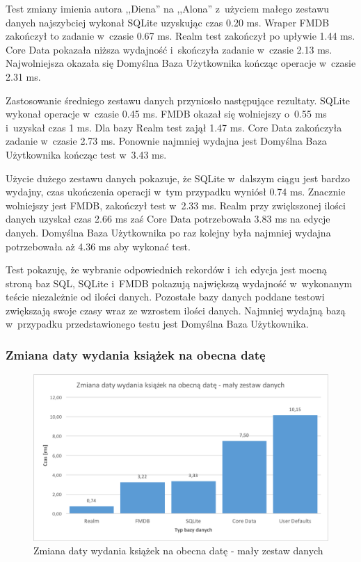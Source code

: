Test zmiany imienia autora ,,Diena'' na ,,Alona'' z~użyciem małego zestawu danych najszybciej wykonał SQLite uzyskując czas 0.20 ms. Wraper FMDB zakończył to zadanie w~czasie 0.67 ms. Realm test zakończył po upływie 1.44 ms. Core Data pokazała niższa wydajność i~skończyła zadanie w~czasie 2.13 ms. Najwolniejsza okazała się Domyślna Baza Użytkownika kończąc operacje w~czasie 2.31 ms. 

Zastosowanie średniego zestawu danych przyniosło następujące rezultaty. SQLite wykonał operacje w~czasie 0.45 ms. FMDB okazał się wolniejszy o~0.55 ms i~uzyskał czas 1 ms. Dla bazy Realm test zajął 1.47 ms. Core Data zakończyła zadanie w~czasie 2.73 ms. Ponownie najmniej wydajna jest Domyślna Baza Użytkownika kończąc test w~3.43 ms.

Użycie dużego zestawu danych pokazuje, że SQLite w~dalszym ciągu jest bardzo wydajny, czas ukończenia operacji w~tym przypadku wyniósł 0.74 ms. Znacznie wolniejszy jest FMDB, zakończył test w~2.33 ms. Realm przy zwiększonej ilości danych uzyskał czas 2.66 ms zaś Core Data potrzebowała 3.83 ms na edycje danych. Domyślna Baza Użytkownika po raz kolejny była najmniej wydajna potrzebowała aż 4.36 ms aby wykonać test. 

Test pokazuję, że wybranie odpowiednich rekordów i~ich edycja jest mocną stroną baz SQL, SQLite i~FMDB pokazują największą wydajność w~wykonanym teście niezależnie od ilości danych. Pozostałe bazy danych poddane testowi zwiększają swoje czasy wraz ze wzrostem ilości danych. Najmniej wydajną bazą w~przypadku przedstawionego testu jest Domyślna Baza Użytkownika. 

\subsubsection{Zmiana daty wydania książek na obecna datę}

\begin{figure}[H]
    \centering\includegraphics[width=\linewidth]{img/update_data/update_book/update_book_small_test.png}
    \caption{Zmiana daty wydania książek na obecna datę - mały zestaw danych}
    \label{img: update-by-book-small}
\end{figure}

